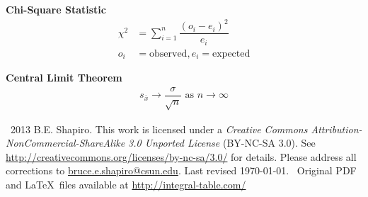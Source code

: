 \documentclass[10pt,letterpaper, landscape]{article}
\newcommand{\Formula}[2]{{#1}{\begin{align}{\displaystyle{#2}}\end{align}}}
\begin{document}
\begin{multicols}{3}
{\large \textbf{Chi-Square Statistic}}
\begin{align}
\chi^2 &= \sum_{i=1}^n\dfrac{(o_i-e_i)^2}{e_i}\\
o_i&=\text{observed}\nonumber,
 e_i=\text{expected}\nonumber
\end{align}

\hrulefill

\Formula{\large \textbf{Central Limit Theorem}}
{
s_{\overline{x}} \to \dfrac{\sigma}{\sqrt{n}} \text{ as  } n\to \infty
} 
 
\end{multicols}
\hrulefill


{\footnotesize \textcopyleft\ 2013 B.E. Shapiro. This work is licensed under a \textit{{Creative Commons Attribution-NonCommercial-ShareAlike 3.0 Unported License}} (BY-NC-SA 3.0). See \url{http://creativecommons.org/licenses/by-nc-sa/3.0/} for details. Please address all corrections to \url{bruce.e.shapiro@csun.edu}. Last revised \today. \ Original PDF and \LaTeX\ files available at  \url{http://integral-table.com/}}

\end{document}
